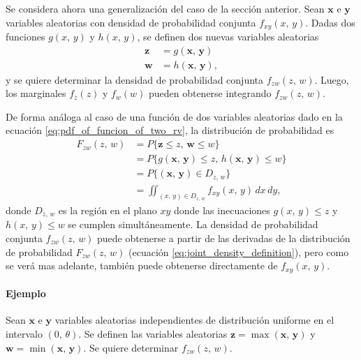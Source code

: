 \documentclass[a4paper]{report}
\newcommand{\x}{\mathbf{x}}
\newcommand{\y}{\mathbf{y}}
\newcommand{\w}{\mathbf{w}}
\newcommand{\z}{\mathbf{z}}
\begin{document}
Se considera ahora una generalización del caso de la sección anterior. Sean \(\x\) e \(\y\) variables aleatorias con densidad de probabilidad conjunta \(f_{xy}(x,\,y)\). Dadas dos funciones \(g(x,\,y)\) y \(h(x,\,y)\), se definen dos nuevas variables aleatorias
\begin{align*}
 \z&=g(\x,\,\y)\\
 \w&=h(\x,\,\y),
\end{align*}
y se quiere determinar la densidad de probabilidad conjunta \(f_{zw}(z,\,w)\). Luego, los marginales \(f_z(z)\) y \(f_w(w)\) pueden obtenerse integrando \(f_{zw}(z,\,w)\).

De forma análoga al caso de una función de dos variables aleatorias dado en la ecuación \ref{eq:pdf_of_funcion_of_two_rv}, la distribución de probabilidad es
\begin{align}\label{eq:pdf_of_two_funcion_of_two_rv}
 F_{zw}(z,\,w)&=P\{\z\leq z,\,\w\leq w\}\nonumber\\
    &=P\{g(\x,\,\y)\leq z,\,h(\x,\,\y)\leq w\}\nonumber\\
    &=P\{(\x,\,\y)\in D_{z,\,w}\}\nonumber\\
    &=\iint_{(x,\,y)\in D_{z,\,w}}f_{xy}(x,\,y)\,dx\,dy,
\end{align}
donde \(D_{z,\,w}\) es la región en el plano \(xy\) donde las inecuaciones \(g(x,\,y)\leq z\) y \(h(x,\,y)\leq w\) se cumplen simultáneamente. La densidad de probabilidad conjunta \(f_{zw}(z,\,w)\) puede obtenerse a partir de las derivadas de la distribución de probabilidad \(F_{zw}(z,\,w)\) (ecuación  \ref{eq:joint_density_definition}), pero como se verá mas adelante, también puede obtenerse directamente de \(f_{xy}(x,\,y)\).

\paragraph{Ejemplo} Sean \(\x\) e \(\y\) variables aleatorias independientes de distribución uniforme en el intervalo \((0,\,\theta)\). Se definen las variables aleatorias \(\z=\max(\x,\,\y)\) y \(\w=\min(\x,\,\y)\). Se quiere determinar \(f_{zw}(z,\,w)\).
\end{document}
